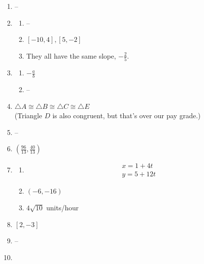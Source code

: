 \documentclass{article}
\begin{document}
\begin{enumerate}
\item --

\item \begin{enumerate}

	\item --
	
	\item $[-10, 4], [5, -2]$
	
	\item They all have the same slope, $-\frac{2}{5}$.
	
	\end{enumerate}
	
\item \begin{enumerate}

	\item $-\frac{a}{b}$
	
	\item --

	\end{enumerate}
	
\item $\triangle A \cong \triangle B \cong \triangle C \cong \triangle E$ \\ (Triangle $D$ is also congruent, but that's over our pay grade.)

\item --

\item $\left( \frac{96}{13}, \frac{40}{13} \right)$

\item \begin{enumerate}

	\item \begin{gather*}
		x = 1 + 4t \\
		y = 5 + 12t
		\end{gather*}
		
	\item $(-6, -16)$
	
	\item $4\sqrt{10}$ units/hour

	\end{enumerate}
	
\item $[2, -3]$

\item --

\item \begin{enumerate}


\end{enumerate}
\end{enumerate}
\end{document}
